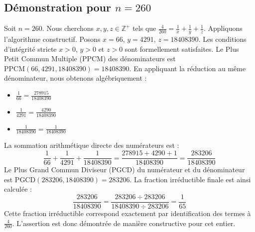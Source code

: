 \documentclass[11pt,a4paper]{article}
\begin{document}
\subsection{Démonstration pour $n = 260$}
Soit $n = 260$. Nous cherchons $x, y, z \in \mathbb{Z}^{+}$ tels que $\frac{4}{260} = \frac{1}{x} + \frac{1}{y} + \frac{1}{z}$.
Appliquons l'algorithme constructif. Posons $x = 66$, $y = 4291$, $z = 18408390$.
Les conditions d'intégrité stricte $x > 0$, $y > 0$ et $z > 0$ sont formellement satisfaites.
Le Plus Petit Commun Multiple (PPCM) des dénominateurs est $\text{PPCM}(66, 4291, 18408390) = 18408390$.
En appliquant la réduction au même dénominateur, nous obtenons algébriquement :
\begin{itemize}
    \item $\frac{1}{66} = \frac{278915}{18408390}$
    \item $\frac{1}{4291} = \frac{4290}{18408390}$
    \item $\frac{1}{18408390} = \frac{1}{18408390}$
\end{itemize}
La sommation arithmétique directe des numérateurs est :
$$ \frac{1}{66} + \frac{1}{4291} + \frac{1}{18408390} = \frac{278915 + 4290 + 1}{18408390} = \frac{283206}{18408390} $$
Le Plus Grand Commun Diviseur (PGCD) du numérateur et du dénominateur est $\text{PGCD}(283206, 18408390) = 283206$.
La fraction irréductible finale est ainsi calculée :
$$ \frac{283206}{18408390} = \frac{283206 \div 283206}{18408390 \div 283206} = \frac{1}{65} $$
Cette fraction irréductible correspond exactement par identification des termes à $\frac{4}{260}$. L'assertion est donc démontrée de manière constructive pour cet entier.
\end{document}
